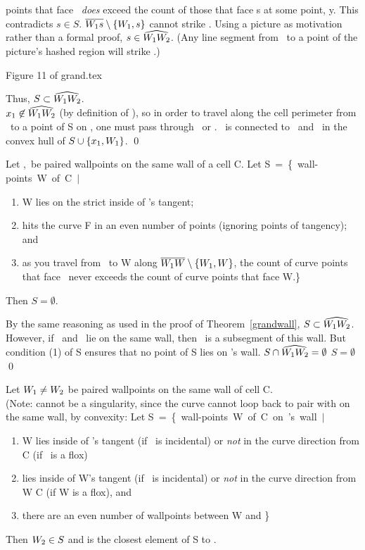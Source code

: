 points that face \wone\ {\em does} exceed the count of those that face s
at some point, y.
This contradicts $s\in S$.
\hence $\mbox{$\overline{\mbox{$W_{1}$} s}$} \setminus \{\mbox{$W_{1}$},s\}$ cannot strike \wwa.
\hence Using a picture as motivation rather than a formal proof,
$s \in \mbox{$\widehat{\mbox{$W_{1}W_{2}$}}$}$. (Any line segment from \wone\ to a point 
of the picture's hashed region 
will strike \wwa.)
\begin{center}
Figure 11 of grand.tex
\end{center}
Thus, $S \subset \mbox{$\widehat{\mbox{$W_{1}W_{2}$}}$}$.\\
$\mbox{$x_{1}$} \not\in \mbox{$\widehat{\mbox{$W_{1}W_{2}$}}$}$ (by definition of \wwh), so in order to travel 
along the cell perimeter from \xone\ to a point of S on \wwh,
one must pass through \wone\ or \wtwo.
\hence \xone\ is connected to \wone\ and \wtwo\ in the convex hull of 
$S \cup \{\mbox{$x_{1}$},\mbox{$W_{1}$}\} $.
\qed
\begin{theorem}
Let \wone,\wtwo\ be paired wallpoints on the same wall of a cell C.
Let \mbox{S = \{ wall-points W of C $\mid$ }
\begin{enumerate}
	\item W lies on the strict inside of \wone's tangent;
	\item {} hits the curve F in an
even number of points (ignoring
points of tangency); and
	\item as you travel from \wone\ to W 
along $\mbox{$\overline{\mbox{$W_{1}$} W}$} \setminus \{\mbox{$W_{1}$},W\}$, the count of curve points
that face \wone\ never exceeds the count of curve points that face W.\}
\end{enumerate}
Then $S=\emptyset$.
\end{theorem}
\proof
By the same reasoning as used in the proof of Theorem~\ref{grandwall},
$S \subset \mbox{$\widehat{\mbox{$W_{1}W_{2}$}}$}$.
However, if \wone\ and \wtwo\ lie on the same wall, then \wwh\ is a subsegment
of this wall.
But condition (1) of S ensures that no point of S lies on \wone's wall.
\hence $S \cap \mbox{$\widehat{\mbox{$W_{1}W_{2}$}}$} = \emptyset$
\hence $S = \emptyset$
\qed
\begin{theorem}\nopagebreak
Let $\mbox{$W_{1}$} \neq \mbox{$W_{2}$}$ be paired wallpoints on the same wall of cell C.\\
(Note: \wone cannot be a singularity, since the curve cannot loop back to pair
with \wtwo on the same wall, by convexity:
Let \mbox{S = \{ wall-points W of C on \wone's wall $\mid$ }
\begin{enumerate}
	\item W lies inside of \wone's tangent (if \wone\ is incidental) or
{\em not} in the curve direction from \wone \wrt C (if \wone\ is a flox)
        \item \wone lies inside of W's tangent (if \wone\ is incidental) or
{\em not} in the curve direction from W \wrt C (if W is a flox), and
        \item there are an even number of wallpoints between W and \wone \}
\end{enumerate}
Then $\mbox{$W_{2}$} \in S$ and \wtwo is the closest element of S to \wone.
\end{theorem}
